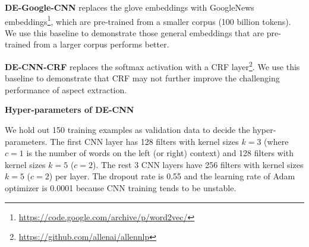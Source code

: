 \textbf{DE-Google-CNN} replaces the glove embeddings with GoogleNews embeddings\footnote{\url{https://code.google.com/archive/p/word2vec/} }, which are pre-trained from a smaller corpus (100 billion tokens). We use this baseline to demonstrate those general embeddings that are pre-trained from a larger corpus performs better.

\textbf{DE-CNN-CRF} replaces the softmax activation with a CRF layer\footnote{\url{https://github.com/allenai/allennlp}}. We use this baseline to demonstrate that CRF may not further improve the challenging performance of aspect extraction.

\textbf{Hyper-parameters of DE-CNN}

We hold out 150 training examples as validation data to decide the hyper-parameters.
The first CNN layer has 128 filters with kernel sizes $k=3$ (where $c=1$ is the number of words on the left (or right) context) and 128 filters with kernel sizes $k=5$ ($c=2$).
The rest 3 CNN layers have 256 filters with kernel sizes $k=5$ ($c=2$) per layer.
The dropout rate is 0.55 and the learning rate of Adam optimizer \cite{kingma2014adam} is 0.0001 because CNN training tends to be unstable.

\begin{table}
    \label{chap6:tab:result} 
    \centering
    \caption{F$_1$ score for AE}
\end{table}

